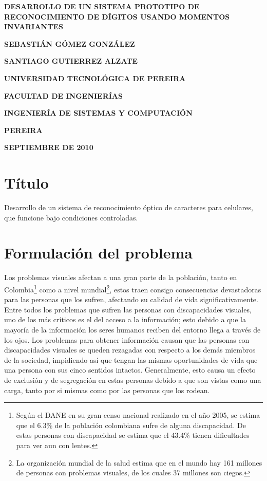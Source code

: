 \documentclass[a4paper, 11pt, oneside]{article}
\newcommand\portada{
	\begin{titlepage}
		\begin{center}
			{\large \bf DESARROLLO DE UN SISTEMA PROTOTIPO DE RECONOCIMIENTO DE DÍGITOS USANDO MOMENTOS INVARIANTES }
			\vfill
			{\large\bf SEBASTIÁN GÓMEZ GONZÁLEZ \par}
			{\large\bf SANTIAGO GUTIERREZ ALZATE \par}
			\vfill
			{\large\bf UNIVERSIDAD TECNOLÓGICA DE PEREIRA  \par}
			{\large\bf FACULTAD DE INGENIERÍAS \par}
			{\large\bf INGENIERÍA DE SISTEMAS Y COMPUTACIÓN \par}
			{\large\bf PEREIRA\par}
			{\large\bf SEPTIEMBRE DE 2010 \par}
		\end{center}
	\end{titlepage}
}
\begin{document}
\portada

	\clearpage
	\section{Título}

	Desarrollo de un sistema de reconocimiento óptico de caracteres para celulares, que funcione bajo condiciones controladas.
	
	\section{Formulación del problema}

	Los problemas visuales afectan a una gran parte de la población, tanto en Colombia\footnote{Según el DANE en su gran censo nacional realizado en el año 2005, se estima que el 6.3\% de la población colombiana sufre de alguna discapacidad. De estas personas con discapacidad se estima que el 43.4\% tienen dificultades para ver aun con lentes.} como a nivel mundial\footnote{La organización mundial de la salud estima que en el mundo hay 161 millones de personas con problemas visuales, de los cuales 37 millones son ciegos.}, estos traen consigo consecuencias devastadoras para las personas que los sufren, afectando su calidad de vida significativamente. Entre todos los problemas que sufren las personas con discapacidades visuales, uno de los más críticos es el del acceso a la información; esto debido a que la mayoría de la información los seres humanos reciben del entorno llega a través de los ojos. Los problemas para obtener información causan que las personas con discapacidades visuales se queden rezagadas con respecto a los demás miembros de la sociedad, impidiendo así que tengan las mismas oportunidades de vida que una persona con sus cinco sentidos intactos. Generalmente, esto causa un efecto de exclusión y de segregación en estas personas debido a que son vistas como una carga, tanto por si mismas como por las personas que los rodean. 
\end{document}
